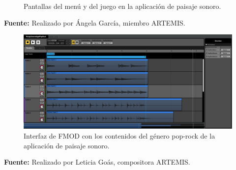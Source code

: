 \begin{figure}[h!]
	\centering
	\hfil
	\caption{Pantallas del menú y del juego en la aplicación de paisaje sonoro.}
	\label{fig:SonoricEnvironment}
	\vspace{-30pt}
\end{figure}

\begin{center}
	\textbf{Fuente:} Realizado por Ángela García, miembro ARTEMIS.
\end{center}

\begin{figure}[h!]
	\centering
	\includegraphics[width=0.8\linewidth]{Figuras/Desarrollo/PaisajeSonoroFMOD.png}
	\caption[Interfaz de FMOD aplicación paisaje sonoro.]{Interfaz de FMOD con los contenidos del género pop-rock de la aplicación de paisaje sonoro.}
	\label{fig:SonoricEnvironmentFMOD}
	\vspace{-40pt}
\end{figure}

\begin{center}
	\textbf{Fuente:} Realizado por Leticia Goás, compositora ARTEMIS.
\end{center}

